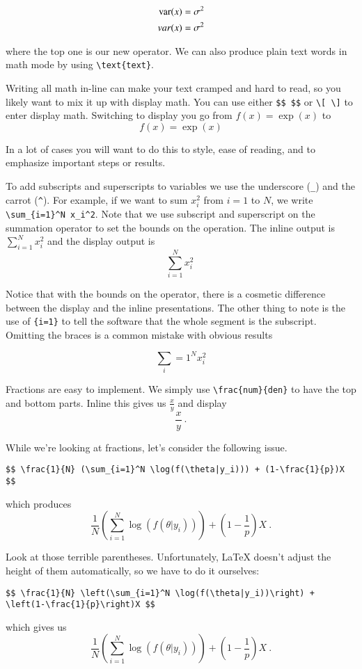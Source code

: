 \begin{align*}
\operatorname{var}(x) &= \sigma^2 \\
var(x) &= \sigma^2
\end{align*}

where the top one is our new operator. We can also produce plain text words in math mode by using \verb|\text{text}|.

Writing all math in-line can make your text cramped and hard to read, so you likely want to mix it up with display math. You can use either \verb|$$ $$| or \verb|\[ \]| to enter display math. Switching to display you go from $f(x) = \exp(x)$ to $$f(x) = \exp(x)$$

In a lot of cases you will want to do this to style, ease of reading, and to emphasize important steps or results.

To add subscripts and superscripts to variables we use the underscore (\verb|_|) and the carrot (\verb|^|). For example, if we want to sum $x_i^2$ from $i=1$ to $N$, we write \verb|\sum_{i=1}^N x_i^2|. Note that we use subscript and superscript on the summation operator to set the bounds on the operation. The inline output is $\sum_{i=1}^N x_i^2$ and the display output is $$\sum_{i=1}^N x_i^2\ $$

Notice that with the bounds on the operator, there is a cosmetic difference between the display and the inline presentations. The other thing to note is the use of \verb|{i=1}| to tell the software that the whole segment is the subscript. Omitting the braces is a common mistake with obvious results
 
$$\sum_i=1^N x_i^2$$ 

Fractions are easy to implement. We simply use \verb|\frac{num}{den}| to have the top and bottom parts. Inline this gives us $\frac{x}{y}$ and display $$\frac{x}{y}\ .$$

While we're looking at fractions, let's consider the following issue.

\begin{lstlisting}
$$ \frac{1}{N} (\sum_{i=1}^N \log(f(\theta|y_i))) + (1-\frac{1}{p})X $$
\end{lstlisting}
which produces
$$\frac{1}{N} (\sum_{i=1}^N \log(f(\theta|y_i))) + (1-\frac{1}{p})X\ .$$

Look at those terrible parentheses. Unfortunately, \LaTeX{} doesn't adjust the height of them automatically, so we have to do it ourselves:

\begin{lstlisting}
$$ \frac{1}{N} \left(\sum_{i=1}^N \log(f(\theta|y_i))\right) + \left(1-\frac{1}{p}\right)X $$
\end{lstlisting}
which gives us
$$\frac{1}{N} \left(\sum_{i=1}^N \log(f(\theta|y_i))\right) + \left(1-\frac{1}{p}\right)X\ .$$

